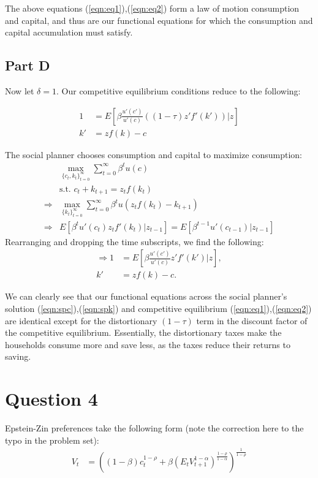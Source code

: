 \documentclass[11pt]{article} %
\begin{document}
The above equations (\ref{eqn:eq1}),(\ref{eqn:eq2}) form a law of motion consumption and capital, and thus are our functional equations for which the consumption and capital accumulation must satisfy.
\subsection{Part D}
Now let $\delta = 1.$ Our competitive equilibrium conditions reduce to the following:

\begin{align}
 1&= E[\beta\frac{u'(c')}{u'(c)}((1-\tau)z'f'(k'))|z] \label{eqn:eq1}\\
k' &= zf(k) - c \label{eqn:eq2}
\end{align}

The social planner chooses consumption and capital to maximize consumption:
\begin{align*}
&\max_{\{c_t,k_t\}_{t=0}^{\infty}} \sum_{t=0}^{\infty}\beta^t u(c)\\
&\text{s.t. } c_t+k_{t+1}  = z_tf(k_t)\\
\Rightarrow &\max_{\{k_t\}_{t=0}^{\infty}} \sum_{t=0}^{\infty} \beta^{t} u( z_tf(k_t) - k_{t+1})\\
\Rightarrow &E[\beta^t u'( c_t)z_tf'(k_t)|z_{t-1}] = E[\beta^{t-1} u'(c_{t-1})|z_{t-1}]
\end{align*}
Rearranging and dropping the time subscripts, we find the following:
\begin{align}
\Rightarrow 1 &= E\left[\beta\frac{u'(c')}{u'(c)}z'f'(k')|z \right], \label{eqn:spc}\\
k' &= zf(k) - c.\label{eqn:spk}
\end{align}

We can clearly see that our functional equations across the social planner's solution (\ref{eqn:spc}),(\ref{eqn:spk}) and competitive equilibrium (\ref{eqn:eq1}),(\ref{eqn:eq2}) are identical except for the distortionary $(1-\tau)$ term in the discount factor of the competitive equilibrium. Essentially, the distortionary taxes make the households consume more and save less, as the taxes reduce their returns to saving.

\section{Question 4}
Epstein-Zin preferences take the following form (note the correction here to the typo in the problem set):
\begin{align*}
V_t &= \left( (1-\beta) c_t^{1-\rho} + \beta(E_tV_{t+1}^{1-\alpha})^{\frac{1-\rho}{1-\alpha}} \right)^{\frac{1}{1-\rho}}
\end{align*}
\end{document}

